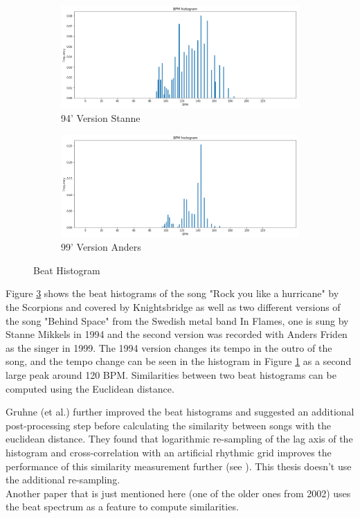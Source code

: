 \begin{figure}[htbp]
{{			\begin{subfigure}{.495\textwidth}
				\centering
				\includegraphics[scale=0.25]{Images/Beat/s_s_bh.png}
				\caption{94' Version Stanne}
				\label{ssbh}
			\end{subfigure}%
			\begin{subfigure}{.495\textwidth}
				\centering
				\includegraphics[scale=0.25]{Images/Beat/s_a_bh.png}
				\caption{99' Version Anders}
				\label{sabh}
			\end{subfigure}%
	}}
	\caption{Beat Histogram}
	\label{fig:bh1}
\end{figure}
\FloatBarrier

\noindent Figure \ref{fig:bh1} shows the beat histograms of the song "Rock you like a hurricane" by the Scorpions and covered by Knightsbridge as well as two different versions of the song "Behind Space" from the Swedish metal band In Flames, one is sung by Stanne Mikkels in 1994 and the second version was recorded with Anders Friden as the singer in 1999. The 1994 version changes its tempo in the outro of the song, and the tempo change can be seen in the histogram in Figure \ref{ssbh} as a second large peak around 120 BPM.
Similarities between two beat histograms can be computed using the Euclidean distance. 


\noindent Gruhne (et al.) further improved the beat histograms and suggested an additional post-processing step before calculating the similarity between songs with the euclidean distance. They found that logarithmic re-sampling of the lag axis of the histogram and cross-correlation with an artificial rhythmic grid improves the performance of this similarity measurement further (see \cite[182]{rbh1}). This thesis doesn't use the additional re-sampling.\\
\noindent Another paper that is just mentioned here (one of the older ones from 2002) uses the beat spectrum as a feature \cite{rhythm1} to compute similarities.

